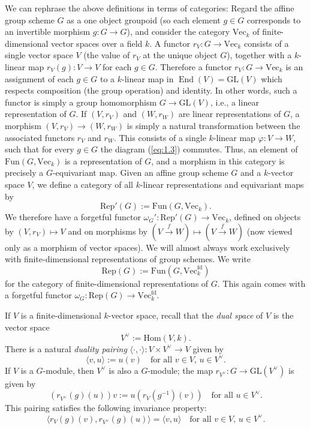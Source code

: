 \documentclass[10pt]{amsart}
\numberwithin{equation}{section}
\def\To#1{\xrightarrow{#1}}
\newcommand{\vp}{\varphi}
\newcommand{\GL}{\mathrm{GL}}
\newcommand{\fd}{\mathrm{fd}}
\newcommand{\Hom}{\mathrm{Hom}}
\DeclareMathOperator{\End}{End}
\renewcommand{\Vec}{\mathrm{Vec}}
\newcommand{\Rep}{\mathrm{Rep}}
\newcommand{\Fun}{\mathrm{Fun}}
\theoremstyle{plain}
\theoremstyle{definition}
\theoremstyle{remark}
\begin{document}
We can rephrase the above definitions in terms of categories: Regard the affine group scheme $G$ as a one object groupoid (so each element $g \in G$ corresponds to an invertible morphism $g: G \to G$), and consider the category $\Vec_k$ of finite-dimensional vector spaces over a field $k$. A functor $r_V: G \to \Vec_k$ consists of a single vector space $V$ (the value of $r_V$ at the unique object $G$), together with a $k$-linear map $r_V(g): V \to V$ for each $g \in G$. Therefore a functor $r_V: G \to \Vec_k$ is an assignment of each $g \in G$ to a $k$-linear map in $\End(V) = \GL(V)$ which respects composition (the group operation) and identity. In other words, such a functor is simply a group homomorphism $G \to \GL(V)$, i.e., a linear representation of $G$. If $(V, r_V)$ and $(W, r_W)$ are linear representations of $G$, a morphism $(V, r_V) \to (W, r_W)$ is simply a natural transformation between the associated functors $r_V$ and $r_W$. This consists of a single $k$-linear map $\vp:  V \to W $, such that for every $g \in G$ the diagram (\ref{eq:1.3}) commutes. Thus, an element of $\Fun(G, \Vec_k)$ is a representation of $G$, and a morphism in this category is precisely a $G$-equivariant map. Given an affine group scheme $G$ and a $k$-vector space $V$, we define a category of all $k$-linear representations and equivariant maps by
\[\Rep'(G) := \Fun\left(G, \Vec_k \right).\] 
We therefore have a forgetful functor $\omega_G': \Rep'(G) \to \Vec_k$, defined on objects by $(V, r_V) \mapsto V$ and on morphisms by $(V \To{f} W) \mapsto (V \To{f} W)$ (now viewed only as a morphism of vector spaces). We will almost always work exclusively with finite-dimensional representations of group schemes. We write
\[\Rep(G) := \Fun\left(G, \Vec_k^\fd\right)\]
for the category of finite-dimensional representations of $G$. This again comes with a forgetful functor $\omega_G: \Rep(G) \to \Vec_k^\fd$. 

If $V$ is a finite-dimensional $k$-vector space, recall that the \emph{dual space} of $V$ is the vector space 
\[V^\vee := \Hom(V, k).\]
There is a natural \emph{duality pairing} $\langle \cdot, \cdot \rangle: V \times V^\vee \to V$ given by
\[\langle v, u \rangle := u(v) \quad \text{for all } v \in V, \, u \in V^\vee.\]
If $V$ is a $G$-module, then $V^\vee$ is also a $G$-module; the map $r_{V^\vee}: G \to \GL(V^\vee)$ is given by
\[\left(r_{V^\vee}(g)(u)\right)v := u \left(r_V(g^{-1})(v) \right) \quad \text{for all } u \in V^\vee.\]
This pairing satisfies the following invariance property:
\[\langle r_V(g)(v), r_{V^\vee}(g)(u) \rangle = \langle v, u \rangle \quad \text{for all } v \in V, \, u \in V^\vee.\]
\end{document}
